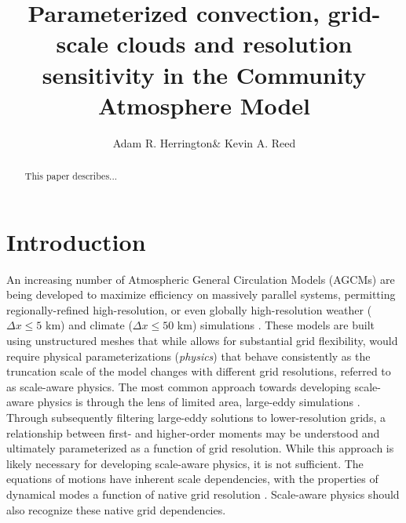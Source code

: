 \documentclass[times]{qjrms4}
\begin{document}

\title{Parameterized convection, grid-scale clouds and resolution sensitivity in the Community Atmosphere Model}

\author{Adam R. Herrington\corrauth \& Kevin A. Reed}
\address{School of Marine and Atmospheric Sciences, Stony Brook University, Stony Brook, NY 11794}


\begin{abstract}
This paper describes...
\end{abstract}


\maketitle

\section{Introduction}

An increasing number of Atmospheric General Circulation Models (AGCMs) are being developed to maximize efficiency on massively parallel systems, permitting regionally-refined high-resolution, or even globally high-resolution weather ($\Delta x \leq 5$ km) and climate ($\Delta x \leq 50$ km) simulations \citep{SMTMN2008JCP,MPASatm,Z2014QJRMS,HETAL2016JCLIM,DCMIP16,LetAl2018JAMES}. These models are built using unstructured meshes that while allows for substantial grid flexibility, would require physical parameterizations ({\em{physics}}) that behave consistently as the truncation scale of the model changes with different grid resolutions, referred to as scale-aware physics. The most common approach towards developing scale-aware physics is through the lens of limited area, large-eddy simulations \citep[e.g.,][]{PC2008JAS,AW2013JAS,SZ2018JCLIM}. Through subsequently filtering large-eddy solutions to lower-resolution grids, a relationship between first- and higher-order moments \citep{G1992JFM} may be understood and ultimately parameterized as a function of grid resolution. While this approach is likely necessary for developing scale-aware physics, it is not sufficient. The equations of motions have inherent scale dependencies, with the properties of dynamical modes a function of native grid resolution \citep{O1981JAS,WETAL1997MWR,PG2006JAS,JR2016QJRMS}. Scale-aware physics should also recognize these native grid dependencies.
\end{document}

